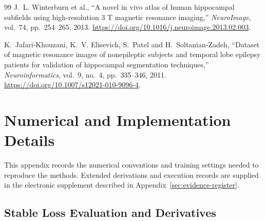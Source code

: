 \documentclass[12pt,a4paper]{article}
\begin{document}
\begin{thebibliography}{99}
J.~L. Winterburn et al., ``A novel in vivo atlas of human hippocampal
subfields using high-resolution 3 T magnetic resonance imaging,''
\emph{NeuroImage}, vol.~74, pp.~254--265, 2013.
\url{https://doi.org/10.1016/j.neuroimage.2013.02.003}.

K.~Jafari-Khouzani, K.~V. Elisevich, S.~Patel and H.~Soltanian-Zadeh,
``Dataset of magnetic resonance images of nonepileptic subjects and
temporal lobe epilepsy patients for validation of hippocampal
segmentation techniques,'' \emph{Neuroinformatics}, vol.~9, no.~4,
pp.~335--346, 2011. \url{https://doi.org/10.1007/s12021-010-9096-4}.

\end{thebibliography}

\clearpage
\appendix

\section{Numerical and Implementation Details}
\label{sec:technical-details}

This appendix records the numerical conventions and training settings
needed to reproduce the methods. Extended derivations and execution
records are supplied in the electronic supplement described in
Appendix~\ref{sec:evidence-register}.

\subsection{Stable Loss Evaluation and Derivatives}
\label{sec:band-implementation-details}
\end{document}
